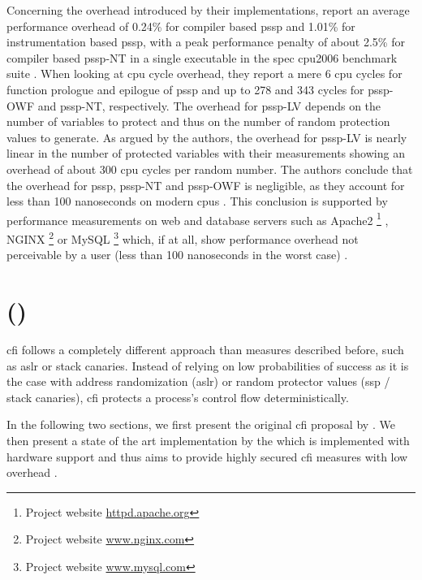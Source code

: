 Concerning the overhead introduced by their implementations, \citeauthor{Wang2018} report an average performance overhead of 0.24\% for compiler based \gls{pssp} and 1.01\% for instrumentation based \gls{pssp}, with a peak performance penalty of about 2.5\% for compiler based \acs{pssp}-NT in a single executable in the \gls{spec} \acs{cpu}2006 benchmark suite \cite[252]{Wang2018}.
When looking at \gls{cpu} cycle overhead, they report a mere 6 \gls{cpu} cycles for function prologue and epilogue of \gls{pssp} and up to 278 and 343 cycles for \acs{pssp}-OWF and \acs{pssp}-NT, respectively.
The overhead for \acs{pssp}-LV depends on the number of variables to protect and thus on the number of random protection values to generate.
As argued by the authors, the overhead for \acs{pssp}-LV is nearly linear in the number of protected variables with their measurements showing an overhead of about 300 \acs{cpu} cycles per random number.
The authors conclude that the overhead for \gls{pssp}, \acs{pssp}-NT and \acs{pssp}-OWF is negligible, as they account for less than 100 nanoseconds on modern \glspl{cpu} \cite[252\psq]{Wang2018}.
This conclusion is supported by performance measurements on web and database servers such as Apache2%
	\footnote{Project website \href{https://httpd.apache.org}{httpd.apache.org}}%
, NGINX%
	\footnote{Project website \href{https://www.nginx.com}{www.nginx.com}}
or MySQL%
	\footnote{Project website \href{https://www.mysql.com}{www.mysql.com}}
which, if at all, show performance overhead not perceivable by a user (less than 100 nanoseconds in the worst case) \cite[252\psq]{Wang2018}.

\section{ ()}
\label{sec:control-flow-integrity}

\gls{cfi} follows a completely different approach than measures described before, such as \gls{aslr} or stack canaries.
Instead of relying on low probabilities of success as it is the case with address randomization (\gls{aslr}) or random protector values (\gls{ssp} / stack canaries), \gls{cfi} protects a process's control flow deterministically.

In the following two sections, we first present the original \gls{cfi} proposal by \citeauthor{Abadi2005} \cite{Abadi2005}.
We then present a state of the art implementation by the \citeauthor{IntelCorporation2019} which is implemented with hardware support and thus aims to provide highly secured \gls{cfi} measures with low overhead \cite{IntelCorporation2019}.

